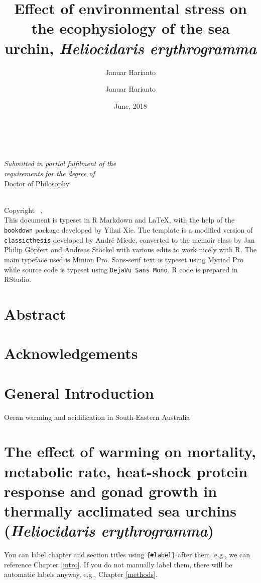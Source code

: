 \documentclass[oneside, a4paper]{memoir}
\title{}
\author{Januar Harianto}
\date{}
\title{Effect of environmental stress on the ecophysiology of the sea urchin, 
  \textit{Heliocidaris erythrogramma}}
\author{Januar Harianto}
\date{June, 2018}
\makeatletter
\newcommand{\smartcopyright}[1]{\begingroup%
	\pagebreak%
	\thispagestyle{empty}%
	\footnotesize%
	\par\vspace*{\fill}%
	\hspace{-1.1cm}%
	\parbox{10cm}{%
		\noindent%
		\@title \\[.2cm]
		Copyright \textcopyright\ \the\year, \@author\\[0.5cm]
		{#1}%
	}%
\endgroup}
\newcommand\@institution{}
\newcommand{\smarttitle}{
{\begingroup
\thispagestyle{empty}
\makeatletter
\center
\vspace*{22 mm}
{\Huge \textcolor{smartblue}{\@title}\\}
\vfill
{\Large \@author\\}
\vspace{5 mm}
{\Large \@date}
\vfill
{\large \itshape {Submitted in partial fulfilment of the\\ requirements for the degree of}} \\
\vskip 0.2in
{\large Doctor of Philosophy}
\vskip 0.2in
{\large \itshape{\@institution}}
\vfill
\makeatother
\endgroup}}
\theoremstyle{definition}
\theoremstyle{definition}
\theoremstyle{definition}
\theoremstyle{remark}
\makeatother
\begin{document}
\frontmatter

\smarttitle
\restoregeometry


\smartcopyright{This document is typeset in R Markdown and \LaTeX, with the help of the \texttt{bookdown} package developed by Yihui Xie. The template is a modified version of \texttt{classicthesis} developed by André Miede, converted to the memoir class by Jan Philip Göpfert and Andreas Stöckel with various edits to work nicely with R. The main typeface used is Minion Pro. Sans-serif text is typeset using \textsf{Myriad Pro} while source code is typeset using \texttt{DejaVu Sans Mono}. R code is prepared in RStudio.}
\cleardoublepage

\chapter*{Abstract}


\cleardoublepage

\chapter*{Acknowledgements}



\cleardoublepage

\mainmatter

{
\setcounter{tocdepth}{1}
\tableofcontents
}
\chapter{General Introduction}\label{general-introduction}

Ocean warming and acidification in South-Eastern Australia

\chapter{\texorpdfstring{The effect of warming on mortality, metabolic
rate, heat-shock protein response and gonad growth in thermally
acclimated sea urchins (\emph{Heliocidaris
erythrogramma})}{The effect of warming on mortality, metabolic rate, heat-shock protein response and gonad growth in thermally acclimated sea urchins (Heliocidaris erythrogramma)}}\label{ch2}


You can label chapter and section titles using \texttt{\{\#label\}}
after them, e.g., we can reference Chapter \ref{intro}. If you do not
manually label them, there will be automatic labels anyway, e.g.,
Chapter \ref{methods}.
\end{document}
